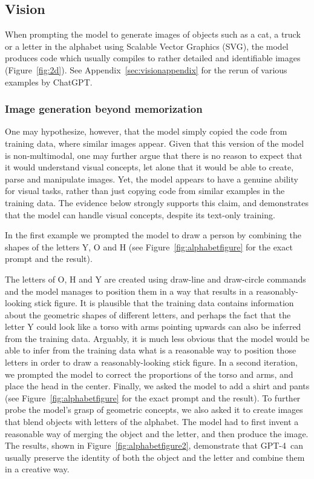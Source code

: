 \subsection{Vision}\label{sec:vision}
When prompting the model to generate images of objects such as a cat, a truck or a letter in the alphabet using Scalable Vector Graphics (SVG), the model produces code which usually compiles to rather detailed and identifiable images (Figure~\ref{fig:2d}). See Appendix~\ref{sec:visionappendix} for the rerun of various examples by ChatGPT.

\subsubsection{Image generation beyond memorization} One may hypothesize, however, that the model simply copied the code from training data, where similar images appear. Given that this version of the model is non-multimodal, one may further argue that there is no reason to expect that it would understand visual concepts, let alone that it would be able to create, parse and manipulate images. Yet, the model appears to have a genuine ability for visual tasks, rather than just copying code from similar examples in the training data. The evidence below strongly supports this claim, and demonstrates that the model can handle visual concepts, despite its text-only training.

In the first example we prompted the model to draw a person by combining the shapes of the letters Y, O and H (see Figure~\ref{fig:alphabetfigure} for the exact prompt and the result). 

The letters of O, H and Y are created using draw-line and draw-circle commands and the model manages to position them in a way that results in a reasonably-looking stick figure. It is plausible that the training data contains information about the geometric shapes of different letters, and perhaps the fact that the letter Y could look like a torso with arms pointing upwards can also be inferred from the training data. Arguably, it is much less obvious that the model would be able to infer from the training data what is a reasonable way to position those letters in order to draw a reasonably-looking stick figure. In a second iteration, we prompted the model to correct the proportions of the torso and arms, and place the head in the center. Finally, we asked the model to add a shirt and pants (see Figure~\ref{fig:alphabetfigure} for the exact prompt and the result). To further probe the model's grasp of geometric concepts, we also asked it to create images that blend objects with letters of the alphabet. The model had to first invent a reasonable way of merging the object and the letter, and then produce the image. The results, shown in Figure~\ref{fig:alphabetfigure2}, demonstrate that GPT-4\ can usually preserve the identity of both the object and the letter and combine them in a creative way.

